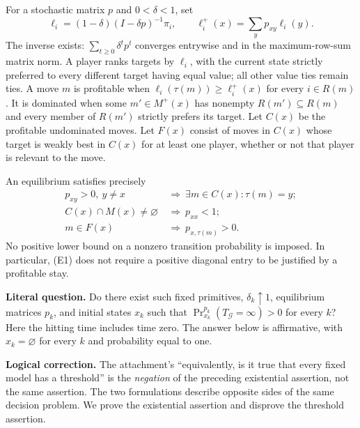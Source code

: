 \documentclass[11pt,a4paper]{article}
\theoremstyle{definition}\newtheorem{definition}[theorem]{Definition}
\theoremstyle{remark}\newtheorem{remark}[theorem]{Remark}
\newcommand{\1}{\mathbf 1}
\begin{document}
For a stochastic matrix $p$ and $0<\delta<1$, set
\[
 \ell_i=(1-\delta)(I-\delta p)^{-1}\pi_i,
 \qquad \ell_i^+(x)=\sum_y p_{xy}\ell_i(y).
\]
The inverse exists: $\sum_{t\ge0}\delta^tp^t$ converges entrywise and in the maximum-row-sum matrix norm. A player ranks targets by $\ell_i$, with the current state strictly preferred to every different target having equal value; all other value ties remain ties. A move $m$ is profitable when
$\ell_i(\tau(m))\ge\ell_i^+(x)$ for every $i\in R(m)$. It is dominated when some $m'\in M^+(x)$ has nonempty $R(m')\subseteq R(m)$ and every member of $R(m')$ strictly prefers its target. Let $C(x)$ be the profitable undominated moves. Let $F(x)$ consist of moves in $C(x)$ whose target is weakly best in $C(x)$ for at least one player, whether or not that player is relevant to the move.

An equilibrium satisfies precisely
\begin{align*}
 p_{xy}>0,
 \ y\ne x&\ \Longrightarrow\ \exists m\in C(x):\tau(m)=y;\tag{E1}\\
 C(x)\cap M(x)\ne\varnothing&\ \Longrightarrow\ p_{xx}<1;\tag{E2}\\
 m\in F(x)&\ \Longrightarrow\ p_{x,\tau(m)}>0.\tag{E3}
\end{align*}
No positive lower bound on a nonzero transition probability is imposed. In particular, (E1) does not require a positive diagonal entry to be justified by a profitable stay.

\textbf{Literal question.} Do there exist such fixed primitives, $\delta_k\uparrow1$, equilibrium matrices $p_k$, and initial states $x_k$ such that
$\Pr_{x_k}^{p_k}(T_{\mathcal G}=\infty)>0$ for every $k$? Here the hitting time includes time zero. The answer below is affirmative, with $x_k=\varnothing$ for every $k$ and probability equal to one.

\textbf{Logical correction.} The attachment's ``equivalently, is it true that every fixed model has a threshold'' is the \emph{negation} of the preceding existential assertion, not the same assertion. The two formulations describe opposite sides of the same decision problem. We prove the existential assertion and disprove the threshold assertion.
\end{document}
